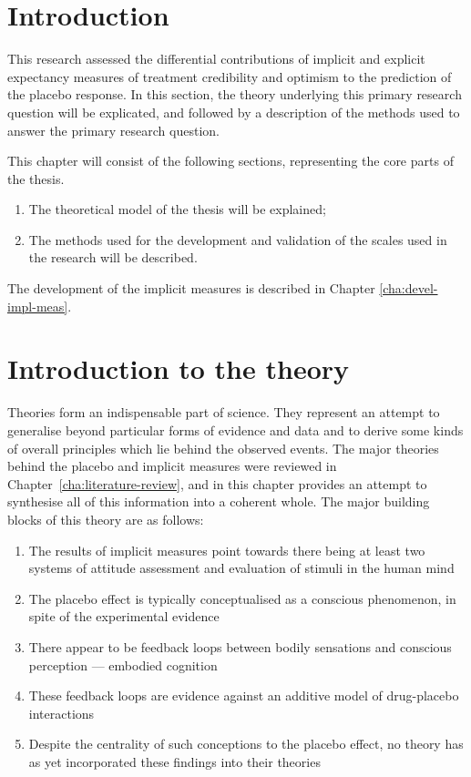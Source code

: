 
\section{Introduction}

This research assessed the differential contributions of implicit and explicit expectancy measures of treatment credibility and optimism to the prediction of the placebo response. 
In this section, the theory underlying this primary research question will be explicated, and followed by a description of the methods used to answer the primary research question. 


This chapter will consist of the following sections, representing the core parts of the thesis.

\begin{enumerate}
\item The theoretical model of the thesis will be explained;
\item The methods used for the development and validation of the scales used in the research will be described.
\end{enumerate}

The development of the implicit measures is described in Chapter \ref{cha:devel-impl-meas}. 

\section{Introduction to the theory}

Theories form an indispensable part of science. They represent an attempt to generalise beyond particular forms of evidence and data and to derive some kinds of overall principles which lie behind the observed events. The major theories behind the placebo and implicit measures were reviewed in  Chapter~\ref{cha:literature-review}, and in this chapter provides  an attempt to synthesise all of this information into a coherent whole. The major building blocks of this theory are as follows:
\begin{enumerate}
\item The results of implicit measures point towards there being at least two systems of attitude assessment and evaluation of stimuli in the human mind%
\item The placebo effect is typically conceptualised as a conscious phenomenon, in spite of the experimental evidence
\item There appear to be feedback loops between bodily sensations and conscious perception --- embodied cognition
\item These feedback loops are evidence against an additive model of drug-placebo interactions
\item Despite the centrality of such conceptions to the placebo effect, no theory has as yet incorporated these findings into their theories
\end{enumerate}


